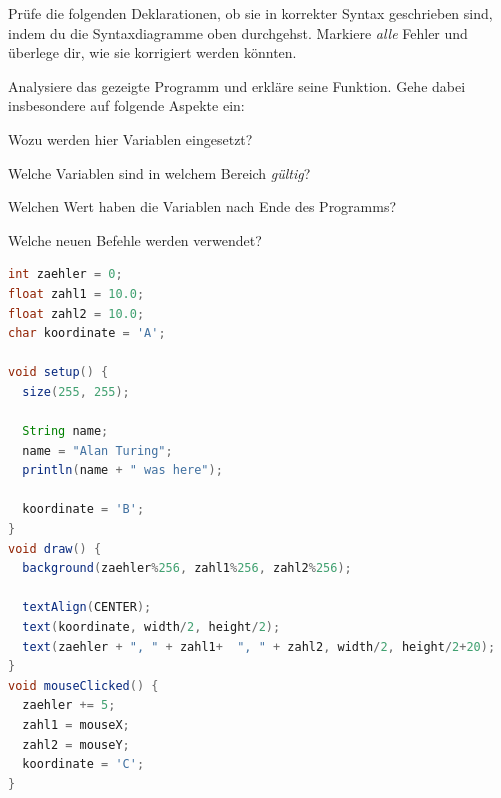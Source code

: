 \documentclass[10pt, a4paper, ngerman]{arbeitsblatt}
\begin{document}


\newpage

\begin{aufgabe}
Prüfe die folgenden Deklarationen, ob sie in korrekter Syntax geschrieben sind, indem du die Syntaxdiagramme oben durchgehst. Markiere \emph{alle} Fehler und überlege dir, wie sie korrigiert werden könnten.

\begin{multicols}{2}
\begin{tasks*}
	\task

	\task

	\task

	\task

	\task

	\task

	\task

	\task

	\task

	\task
\end{tasks*}
\end{multicols}
\end{aufgabe}

\begin{aufgabe}
Analysiere das gezeigte Programm und erkläre seine Funktion. Gehe dabei insbesondere auf folgende Aspekte ein:
\begin{smallitem}
	\item Wozu werden hier Variablen eingesetzt?
	\item Welche Variablen sind in welchem Bereich
	\emph{gültig}?
	\item Welchen Wert haben die Variablen nach Ende des Programms?
	\item Welche neuen Befehle werden verwendet?
\end{smallitem}

\begin{lstlisting}[language=java]
int zaehler = 0;
float zahl1 = 10.0;
float zahl2 = 10.0;
char koordinate = 'A';

void setup() {
  size(255, 255);

  String name;
  name = "Alan Turing";
  println(name + " was here");

  koordinate = 'B';
}
void draw() {
  background(zaehler%256, zahl1%256, zahl2%256);

  textAlign(CENTER);
  text(koordinate, width/2, height/2);
  text(zaehler + ", " + zahl1+  ", " + zahl2, width/2, height/2+20);
}
void mouseClicked() {
  zaehler += 5;
  zahl1 = mouseX;
  zahl2 = mouseY;
  koordinate = 'C';
}
\end{lstlisting}
\end{aufgabe}
\end{document}
